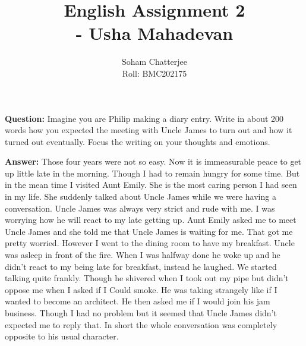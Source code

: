 \documentclass{article}
\title{\huge{English Assignment 2\\\hspace{7cm}- Usha Mahadevan}
}
\author{Soham Chatterjee\\Roll: BMC202175}
\date{}
\begin{document}
	\maketitle\pagebreak
	\textbf{Question:} Imagine you are Philip making a diary entry.  Write in about 200 words how you expected the meeting with Uncle James to turn out and how it turned out eventually. Focus the writing on your thoughts and emotions.
	
	\textbf{Answer:} Those four years  were not so easy. Now it is immeasurable peace to get up little late in the morning. Though I had to remain hungry  for some time. But in the mean time I visited Aunt Emily. She is the most caring person I had seen in my life. She suddenly talked about Uncle James while we were having a conversation. Uncle James was always very strict and rude with me. I was worrying how he will react to my late getting up. Aunt Emily asked me to meet Uncle James and she told me that Uncle James is waiting for me. That got me pretty worried. However I went to the dining room to have my breakfast. Uncle was asleep in front of the fire. When I was halfway done he woke up and he didn't react to my being late for breakfast, instead he laughed. We started talking quite frankly. Though he shivered when I took out my pipe but didn't oppose me when I asked if I Could smoke. He was taking strangely like if I wanted to become an architect. He then asked me if I would join his jam business. Though I had no problem but it seemed that Uncle James didn't expected me to reply that. In short the whole conversation was completely opposite to his usual character.
\end{document}

